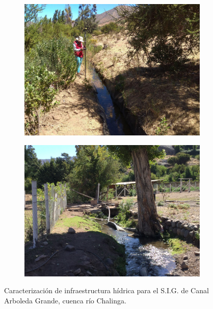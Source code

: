 \documentclass[]{article}
\begin{document}
\begin{figure}[H]
  \centering
\begin{subfigure}{.45\textwidth}
\hfill
  \includegraphics[width=\textwidth]{Foto/a1.jpg}
\end{subfigure}
\hfill
\begin{subfigure}{.45\textwidth}
\hfill
  \includegraphics[angle= 180, width=\textwidth]{Foto/a2.jpg} 
\end{subfigure}
\caption{Caracterización de infraestructura hídrica para el S.I.G. de Canal Arboleda Grande, cuenca río Chalinga.}
\end{figure}
\end{document}
